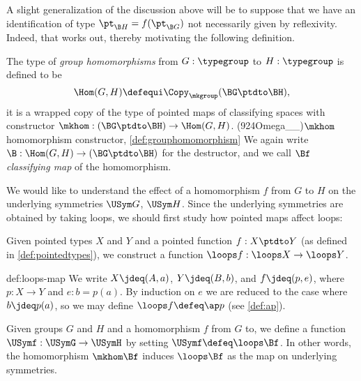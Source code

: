 A slight generalization of the discussion above will be to suppose that we have an identification of type $\pt_{\B H} = f ( \pt_{\B G} ) $ not
necessarily given by reflexivity.  Indeed, that works out, thereby motivating the following definition.

\begin{definition}\label{def:grouphomomorphism}
  The type of \emph{group homomorphisms} from $G:\typegroup$ to
  $H:\typegroup$ is defined to be
  \[
    \Hom(G,H)\defequi\Copy_{\mkgroup}(\BG\ptdto\BH),
  \]
  \ie it is a wrapped copy of the type of pointed maps of classifying spaces
  with constructor
  $\mkhom : (\BG \ptdto \BH) \to \Hom(G,H)$.%
  \glossary(924Omega__){$\protect\mkhom$}{homomorphism constructor, \cref{def:grouphomomorphism}}
  We again write $\B : \Hom(G,H) \to (\BG \ptdto \BH)$ for the destructor,
  and we call $\Bf$ \emph{classifying map} of the homomorphism.
\end{definition}

We would like to understand the effect of a homomorphism $f$ from $G$ to $H$
on the underlying symmetries $\USym G$, $\USym H$.
Since the underlying symmetries are obtained by taking loops,
we should first study how pointed maps affect loops:

\begin{construction}\label{def:loops-map}
  Given pointed types $X$ and $Y$ and a pointed function $f : X\ptdto Y$ (as defined in \cref{def:pointedtypes}),
  we construct a function $\loops f : \loops X \to \loops Y$.
\end{construction}

\begin{implementation}{def:loops-map}
  We write $X \jdeq (A,a)$, $Y \jdeq (B,b)$, and $f \jdeq (p,e)$, where $p : X \to Y$ and $e : b = p(a)$.
  By induction on $e$ we are reduced to the case where $b \jdeq p(a)$, so we may define $\loops f \defeq \ap p$
  (see \cref{def:ap}).
\end{implementation}

\begin{definition}\label{def:USym-hom}
  Given groups $G$ and $H$ and a homomorphism  $f$ from $G$ to, we define a function $\USymf : \USymG \to \USymH$
  by setting $\USymf \defeq \loops \Bf$.
  In other words, the homomorphism $\mkhom\Bf$
  induces $\loops\Bf$ as the map on underlying symmetries.
\end{definition}

